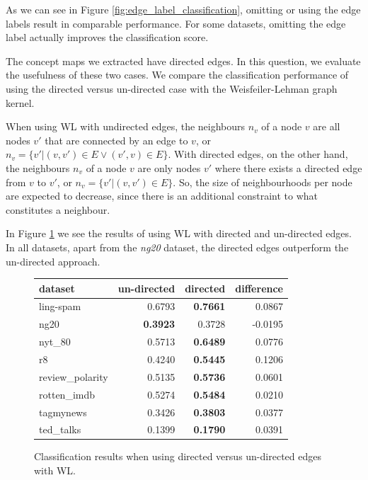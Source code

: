 As we can see in Figure \ref{fig:edge_label_classification}, omitting or using the edge labels result in comparable performance.
For some datasets, omitting the edge label actually improves the classification score.


The concept maps we extracted have directed edges.
In this question, we evaluate the usefulness of these two cases.
We compare the classification performance of using the directed versus un-directed case with the Weisfeiler-Lehman graph kernel.

When using WL with undirected edges, the neighbours $n_v$ of a node $v$ are all nodes $v'$ that are connected by an edge to $v$, or $n_v = \{v' | (v, v') \in E \lor (v', v ) \in E \}$.
With directed edges, on the other hand, the neighbours $n_v$ of a node $v$ are only nodes $v'$ where there exists a directed edge from $v$ to $v'$, or $n_v = \{v' | (v, v') \in E \}$.
So, the size of neighbourhoods per node are expected to decrease, since there is an additional constraint to what constitutes a neighbour.

In Figure \ref{fig:results_directed_vs_undirected} we see the results of using WL with directed and un-directed edges.
In all datasets, apart from the \textit{ng20} dataset, the directed edges outperform the un-directed approach.

\begin{figure}[ht]
	\centering
\begin{tabular}{lrrr}
	dataset &  un-directed & directed &  difference \\
	\midrule
	ling-spam       &  0.6793 &  \textbf{0.7661} &  0.0867 \\
	ng20            &  \textbf{0.3923} &  0.3728 & -0.0195 \\
	nyt\_80          &  0.5713 &  \textbf{0.6489} &  0.0776 \\
	r8              &  0.4240 &  \textbf{0.5445} &  0.1206 \\
	review\_polarity &  0.5135 & \textbf{ 0.5736 }&  0.0601 \\
	rotten\_imdb     &  0.5274 &  \textbf{0.5484} &  0.0210 \\
	tagmynews       &  0.3426 &  \textbf{0.3803} &  0.0377 \\
	ted\_talks       &  0.1399 &  \textbf{0.1790} &  0.0391 \\
	\bottomrule
\end{tabular}
\caption{Classification results when using directed versus un-directed edges with WL.}\label{fig:results_directed_vs_undirected}
\end{figure}

